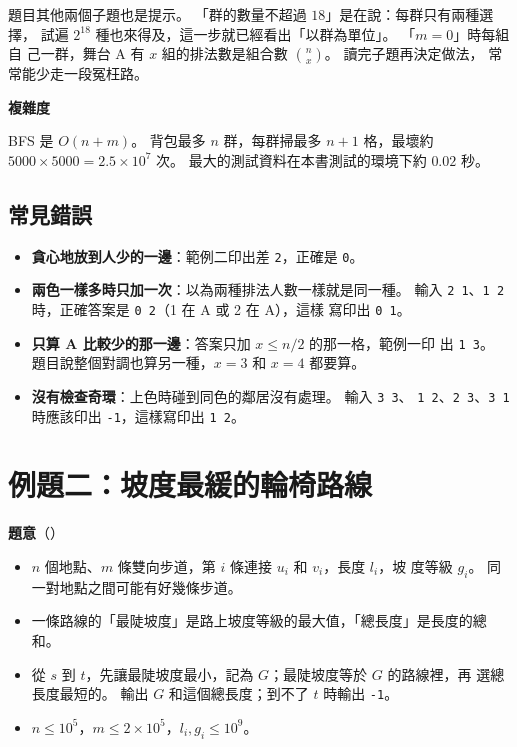 
題目其他兩個子題也是提示。 「群的數量不超過 $18$」是在說：每群只有兩種選擇，
試遍 $2^{18}$ 種也來得及，這一步就已經看出「以群為單位」。 「$m = 0$」時每組自
己一群，舞台 A 有 $x$ 組的排法數是組合數 $\binom{n}{x}$。 讀完子題再決定做法，
常常能少走一段冤枉路。

\textbf{複雜度}

BFS 是 $O(n + m)$。 背包最多 $n$ 群，每群掃最多 $n + 1$ 格，最壞約
$5000 \times 5000 = 2.5 \times 10^7$ 次。 最大的測試資料在本書測試的環境下約
$0.02$ 秒。

\subsection{常見錯誤}

\begin{itemize}
\item \textbf{貪心地放到人少的一邊}：範例二印出差 \texttt{2}，正確是 \texttt{0}。
\item \textbf{兩色一樣多時只加一次}：以為兩種排法人數一樣就是同一種。 輸入
\texttt{2 1}、\texttt{1 2} 時，正確答案是 \texttt{0 2}（1 在 A 或 2 在 A），這樣
寫印出 \texttt{0 1}。
\item \textbf{只算 A 比較少的那一邊}：答案只加 $x \le n / 2$ 的那一格，範例一印
出 \texttt{1 3}。 題目說整個對調也算另一種，$x = 3$ 和 $x = 4$ 都要算。
\item \textbf{沒有檢查奇環}：上色時碰到同色的鄰居沒有處理。 輸入 \texttt{3 3}、
\texttt{1 2}、\texttt{2 3}、\texttt{3 1} 時應該印出 \texttt{-1}，這樣寫印出
\texttt{1 2}。
\end{itemize}

\section{例題二：坡度最緩的輪椅路線}
\label{sec:cap-slope}

\textbf{題意}（）

\begin{itemize}
\item $n$ 個地點、$m$ 條雙向步道，第 $i$ 條連接 $u_i$ 和 $v_i$，長度 $l_i$，坡
度等級 $g_i$。 同一對地點之間可能有好幾條步道。
\item 一條路線的「最陡坡度」是路上坡度等級的最大值，「總長度」是長度的總和。
\item 從 $s$ 到 $t$，先讓最陡坡度最小，記為 $G$；最陡坡度等於 $G$ 的路線裡，再
選總長度最短的。 輸出 $G$ 和這個總長度；到不了 $t$ 時輸出 \texttt{-1}。
\item $n \le 10^5$，$m \le 2 \times 10^5$，$l_i, g_i \le 10^9$。
\end{itemize}

